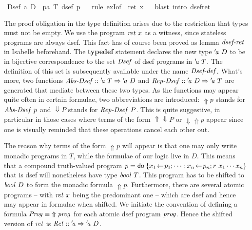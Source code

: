 \begin{isabellebody}
\isanewline
\isamarkuptrue%
\ {\isacharparenleft}Dsef{\isacharparenright}\ {\isacharparenleft}{\isacharprime}a{\isacharparenright}\ D\ {\isacharequal}\ {\isachardoublequote}{\isacharbraceleft}p{\isacharcolon}{\isacharcolon}{\isacharprime}a\ T{\isachardot}\ dsef\ p{\isacharbraceright}{\isachardoublequote}\isanewline
\ \ \isamarkupfalse%
rule\ exI{\isacharbrackleft}of\ {\isacharunderscore}\ {\isachardoublequote}ret\ x{\isachardoublequote}{\isacharbrackright}{\isacharparenright}\isanewline
\ \ \isamarkupfalse%
blast\ intro{\isacharcolon}\ dsef{\isacharunderscore}ret{\isacharparenright}\isanewline
\isamarkupfalse%
\isamarkupfalse%
\isanewline%
\end{isabellebody}

The proof obligation in the type definition arises due to the
restriction that types must not be empty. We use the program $\mathit{ret}~x$ as a
witness, since stateless programs are always dsef. This fact has of course been
proved as lemma $\mbox{\emph{dsef-ret}}$ in Isabelle beforehand.
 The \textbf{typedef} statement declares the new
type ${'\!\mathit{a}}\ D$ to be in bijective correspondence to the set $\mathit{Dsef}$ of
dsef programs in ${'\!\mathit{a}}\ T$. The definition of this set is subsequently
available under the name $\mbox{\emph{Dsef-def}}$. What's more, two functions
$\mbox{\emph{Abs-Dsef}} :: {'\!\mathit{a}}\ T \Rightarrow {'\!\mathit{a}}\ D$ and $\mbox{\emph{Rep-Dsef}} :: {'\!\mathit{a}}\
D \Rightarrow {'\!\mathit{a}}\ T$ are generated that mediate between these two types. As the
functions may appear quite often in certain formulae, two abbreviations are
introduced: $\Uparrow p$ stands for $\mbox{\emph{Abs-Dsef}}\ p$ and $\Downarrow P$ stands for
$\mbox{\emph{Rep-Dsef}}\ P$. This is quite suggestive, in particular in those cases
where terms of the form $\Uparrow \Downarrow P$ or $\Downarrow \Uparrow p$ appear since one is visually reminded
that these operations cancel each other out.

\begin{rem} \label{rem:cast-ret-isabelle} The reason why terms of the form $\Uparrow p$
  will appear is that one may only write monadic programs in $T$, while
  the formulae of our logic live in $D$. This means that a compound
  truth-valued program $p = \mathsf{do}\: \{x_1\!\gets\! p_1; \cdots; x_n\!\gets\! p_n; r\ x_1 \cdots
    x_n\}$ that is dsef will nonetheless have type $\mathit{bool}\ T$. This program
  has to be shifted to $\mathit{bool}\ D$ to form the monadic formula $\Uparrow p$.
  Furthermore, there are several atomic programs -- with $\mathit{ret}~x$ being the
  predominant one -- which are dsef and hence may appear in formulae when
  shifted. We initiate the convention of defining a formula $\mathit{Prog}
  \equiv\; \Uparrow \mathit{prog}$ for each atomic dsef program $\mathit{prog}$. Hence the shifted
  version of $\mathit{ret}$ is $\op{Ret}:: \ivar{a} \Rightarrow \ivar{a}\ D$.
\end{rem}

